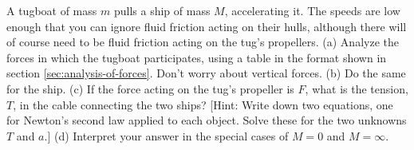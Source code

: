A tugboat of mass $m$ pulls a ship of mass $M$,
accelerating it. The speeds are low enough that you can
ignore fluid friction acting on their hulls, although there
will of course need to be fluid friction acting on
the tug's propellers.\hwendpart
(a) Analyze the forces in which the tugboat participates,
using a table in the format shown in section \ref{sec:analysis-of-forces}. Don't
worry about vertical forces.\hwendpart
(b) Do the same for the ship.\hwendpart
(c) If the force acting on the tug's
propeller is $F$, what is the tension, $T$, in the cable
connecting the two ships? [Hint: Write down two equations,
one for Newton's second law applied to each object. Solve
these for the two unknowns $T$ and $a$.]\answercheck\hwendpart
(d) Interpret your answer in the special cases of $M=0$ and $M=\infty$.
